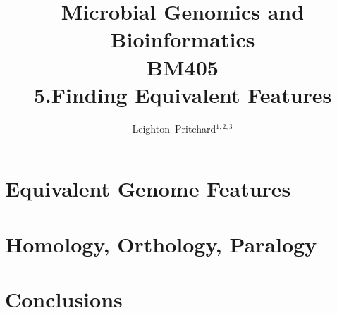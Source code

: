 

\title[Microbial Genomics and Bioinformatics: 5.Equivalent Features] %
{Microbial Genomics and \\ Bioinformatics \\
BM405 \\
5.Finding Equivalent Features}
\author[Pritchard] %
{Leighton~Pritchard$^{1,2,3}$}
\subject{Bioinformatics, Genomics, Bacteria, Sequencing, Microbiology, Microbes}

\frame[plain]{\titlepage}



\section{Equivalent Genome Features}


\section{Homology, Orthology, Paralogy}





\section{Conclusions}


